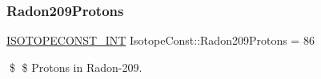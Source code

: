 \subsubsection{\texorpdfstring{Radon209\+Protons}{Radon209Protons}}
{\footnotesize\ttfamily \mbox{\hyperlink{group___isotope_const-_macros_ga5f18360b3e99483a35c32d789e62621c}{I\+S\+O\+T\+O\+P\+E\+C\+O\+N\+S\+T\+\_\+\+I\+NT}} Isotope\+Const\+::\+Radon209\+Protons = 86}

\$ \$ Protons in Radon-\/209. 
